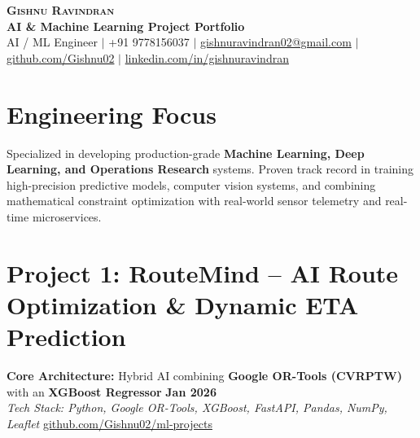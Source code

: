 \documentclass[letterpaper,10pt]{article}
\begin{document}
\begin{center}
    {\LARGE \textbf{\scshape Gishnu Ravindran}} \\ \vspace{2pt}
    {\large \textbf{\color{NavyBlue} AI \& Machine Learning Project Portfolio}} \\ \vspace{3pt}
    \small{
      AI / ML Engineer \enspace$|$\enspace 
      +91 9778156037 \enspace$|$\enspace 
      \href{mailto:gishnuravindran02@gmail.com}{gishnuravindran02@gmail.com} \enspace$|$\enspace 
      \href{https://github.com/Gishnu02}{github.com/Gishnu02} \enspace$|$\enspace 
      \href{https://linkedin.com/in/gishnuravindran}{linkedin.com/in/gishnuravindran}
    }
\end{center}
\vspace{-10pt}

\section{Engineering Focus}
\small{
Specialized in developing production-grade \textbf{Machine Learning, Deep Learning, and Operations Research} systems. Proven track record in training high-precision predictive models, computer vision systems, and combining mathematical constraint optimization with real-world sensor telemetry and real-time microservices.
}
\vspace{-2pt}

\section{Project 1: RouteMind -- AI Route Optimization \& Dynamic ETA Prediction}
\textbf{Core Architecture:} Hybrid AI combining \textbf{Google OR-Tools (CVRPTW)} with an \textbf{XGBoost Regressor} \hfill \textbf{Jan 2026} \\
\textit{\small Tech Stack: Python, Google OR-Tools, XGBoost, FastAPI, Pandas, NumPy, Leaflet} \hfill \href{https://github.com/Gishnu02/ml-projects}{\color{NavyBlue}\small github.com/Gishnu02/ml-projects}
\end{document}
